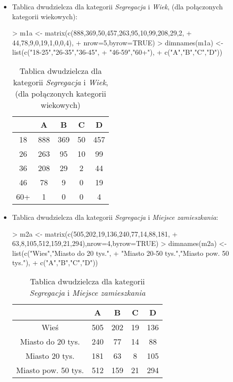 \documentclass[12pt]{mwart}
\begin{document}
\begin{itemize}[label=$\bullet$]
	\item Tablica dwudzielcza dla kategorii \emph{Segregacja} i \emph{Wiek}, (dla połączonych kategorii wiekowych):
\begin{Schunk}
\begin{Sinput}
> m1a <- matrix(c(888,369,50,457,263,95,10,99,208,29,2,
+ 			44,78,9,0,19,1,0,0,4),
+ 				nrow=5,byrow=TRUE)
> dimnames(m1a) <- list(c("18-25","26-35","36-45",
+ 			"46-59","60+"),
+ 			c("A","B","C","D"))
\end{Sinput}
\end{Schunk}
\begin{table}[h!]
	\begin{center}
		\begin{tabular}{|c|c|c|c|c|}
			\hline
			& A & B & C & D \\\hline
			18\dywiz25 & 888& 369& 50& 457 \\\hline
			26\dywiz35 & 263& 95& 10& 99 \\\hline
			36\dywiz45 & 208& 29& 2& 44 \\\hline
			46\dywiz59 & 78& 9& 0& 19 \\\hline
			60+ & 1& 0& 0& 4 \\\hline
		\end{tabular}
	\end{center}
	\caption{Tablica dwudzielcza dla kategorii \emph{Segregacja} i \emph{Wiek}, (dla połączonych kategorii wiekowych)}
	\label{tab:tabela4}
\end{table}

	\item Tablica dwudzielcza dla kategorii \emph{Segregacja} i \emph{Miejsce zamieszkania}:

\begin{Schunk}
\begin{Sinput}
> m2a <- matrix(c(505,202,19,136,240,77,14,88,181,
+ 		63,8,105,512,159,21,294),nrow=4,byrow=TRUE)
> dimnames(m2a) <- list(c("Wies","Miasto do 20 tys.",
+ 	"Miasto 20-50 tys.","Miasto pow. 50 tys."),
+ 			c("A","B","C","D"))
\end{Sinput}
\end{Schunk}

\begin{table}[h!]
	\begin{center}
		\begin{tabular}{|c|c|c|c|c|}
			\hline
			& A & B & C & D \\\hline
			Wieś & 505& 202& 19& 136 \\\hline
			Miasto do 20 tys. & 240& 77& 14& 88 \\\hline
			Miasto 20\dywiz50 tys. & 181& 63& 8& 105 \\\hline
			Miasto pow. 50 tys. & 512& 159& 21& 294 \\\hline
		\end{tabular}
	\end{center}
	\caption{Tablica dwudzielcza dla kategorii \emph{Segregacja} i \emph{Miejsce zamieszkania}}
	\label{tab:tabela5}
\end{table}


\end{itemize}
\end{document}
